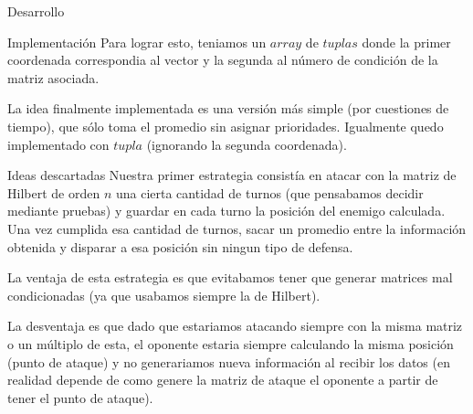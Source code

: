 \begin{section}{Desarrollo}
\begin{subsection}{Implementación}
		Para lograr esto, teniamos un $array$ de $tuplas$ donde la primer coordenada correspondia al vector y la segunda al número de condición de la matriz asociada.
		
		La idea finalmente implementada es una versión más simple (por cuestiones de tiempo), que sólo toma el promedio sin asignar prioridades. Igualmente quedo implementado con $tupla$ (ignorando la segunda coordenada).
	\end{subsection}
	\begin{subsection}{Ideas descartadas}
		Nuestra primer estrategia consistía en atacar con la matriz de Hilbert de orden $n$ una cierta cantidad de turnos (que pensabamos decidir mediante pruebas) y guardar en cada turno la posición del enemigo calculada. Una vez cumplida esa cantidad de turnos, sacar un promedio entre la información obtenida y disparar a esa posición sin ningun tipo de defensa.
		
		La ventaja de esta estrategia es que evitabamos tener que generar matrices mal condicionadas (ya que usabamos siempre la de Hilbert).
		
		La desventaja es que dado que estariamos atacando siempre con la misma matriz o un múltiplo de esta, el oponente estaria siempre calculando la misma posición (punto de ataque) y no generariamos nueva información al recibir los datos (en realidad depende de como genere la matriz de ataque el oponente a partir de tener el punto de ataque).
	\end{subsection}
\end{section}